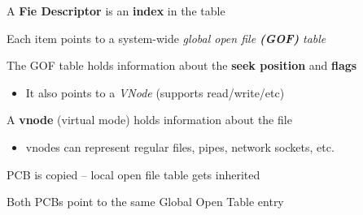  \begin{slide}
    

     A \textbf{Fie Descriptor} is an \textbf{index} in the table
    \bigskip

     Each item points to a system-wide \textit{global open file \textbf{(GOF)} table}
    \bigskip

     The GOF table holds information about the \textbf{seek position} and \textbf{flags}
	\begin{itemize}
		\item It also points to a \textit{VNode} (supports read/write/etc)
	\end{itemize}
    \bigskip

     A \textbf{vnode} (virtual mode) holds information about the file
	\begin{itemize}
	    \item vnodes can represent regular files, pipes, network sockets, etc.
	\end{itemize}

 \end{slide}

 \begin{slide}
    

    PCB is copied – local open file table gets inherited
	\bigskip
	
	Both PCBs point to the same Global Open Table entry

 \end{slide}

